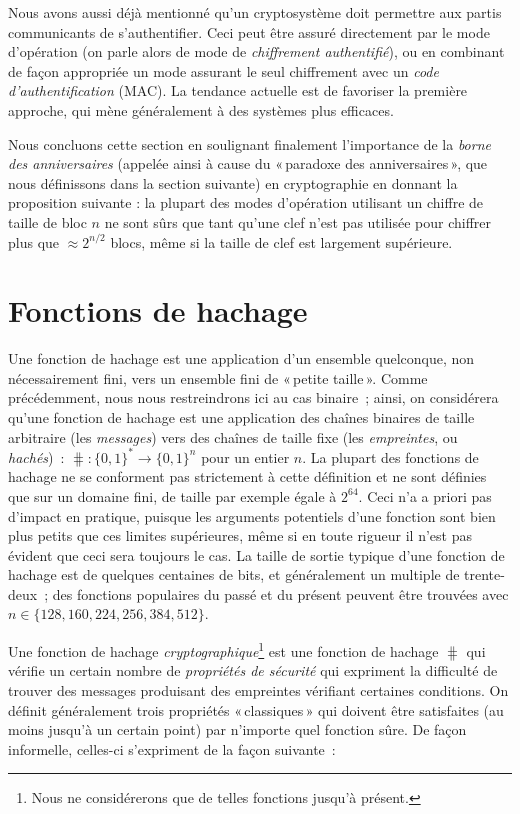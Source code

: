 Nous avons aussi déjà mentionné qu'un cryptosystème doit permettre aux partis communicants de s'authentifier. Ceci peut être assuré directement
par le mode d'opération (on parle alors de mode de \emph{chiffrement authentifié}), ou en combinant de façon appropriée un mode assurant le seul chiffrement avec
un \emph{code d'authentification} (MAC).
La tendance actuelle est de favoriser la première approche, qui mène généralement à des systèmes plus efficaces.


Nous concluons cette section en soulignant finalement l'importance de la \emph{borne des anniversaires} (appelée ainsi à cause du «\,paradoxe des anniversaires\,»,
que nous définissons dans la section suivante) en cryptographie en donnant la proposition suivante : la plupart des modes d'opération
utilisant un chiffre de taille de bloc $n$ ne sont sûrs que tant qu'une clef n'est pas utilisée pour chiffrer plus que $\approx 2^{n/2}$ blocs,
même si la taille de clef est largement supérieure.




\section{Fonctions de hachage}

Une fonction de hachage est une application d'un ensemble quelconque, non nécessairement fini, vers un ensemble fini de «\,petite taille\,».
Comme précédemment, nous nous restreindrons ici au cas binaire~; ainsi, on considérera qu'une  
fonction de hachage  est une application des chaînes binaires de taille arbitraire (les \emph{messages}) vers des chaînes de taille
fixe (les \emph{empreintes}, ou \emph{hachés})~:
$\hash : \{0,1\}^* \rightarrow \{0,1\}^n$ pour un entier $n$.
La plupart des fonctions de hachage ne se conforment pas strictement à cette définition et ne sont définies que sur un domaine fini, de taille par exemple égale
à $2^{64}$. Ceci n'a a priori pas d'impact en pratique, puisque les arguments potentiels d'une fonction sont bien plus petits que ces
limites supérieures, même si en toute rigueur il n'est pas évident que ceci sera toujours le cas. 
La taille de sortie typique d'une fonction de hachage est de quelques centaines de bits, et généralement un multiple de trente-deux~; des fonctions populaires
du passé et du présent peuvent être trouvées avec 
$n \in \{128, 160, 224, 256, 384, 512\}$.

Une fonction de hachage \emph{cryptographique}\footnote{Nous ne considérerons que de telles fonctions jusqu'à présent.} est une fonction
de hachage $\hash$ qui vérifie un certain nombre de \emph{propriétés de sécurité} qui expriment la difficulté de trouver des messages
produisant des empreintes vérifiant certaines conditions. On définit généralement trois propriétés «\,classiques\,» qui doivent être satisfaites
(au moins jusqu'à un certain point) par n'importe quel fonction sûre. De façon informelle, celles-ci s'expriment de la façon suivante~:

